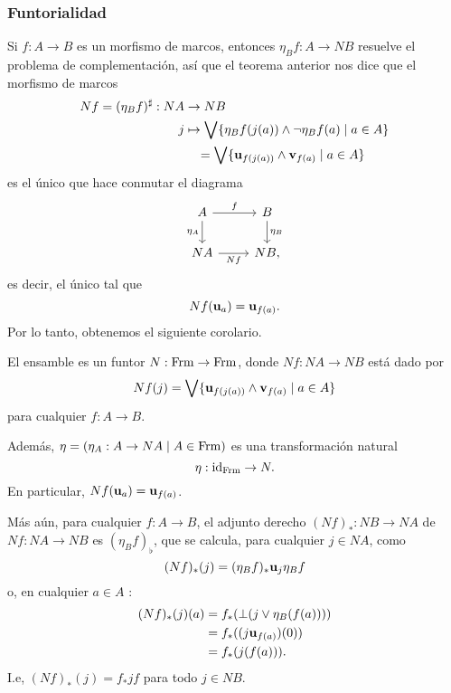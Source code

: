\subsubsection{Funtorialidad}

Si $f:A\to B$ es un morfismo de marcos, entonces
$\eta_Bf:A\to NB$ resuelve
el problema de complementación, así que el teorema anterior nos dice
que el morfismo de marcos
\begin{align}
  Nf=(\eta_Bf)^{\sharp}:NA&\to NB \\
  j&\mapsto \bigvee\{\eta_Bf(j(a)) \wedge \neg \eta_Bf(a)\mid a\in A\} \\
   &\quad =\bigvee\{\mathbf u_{f(j(a))} \wedge \mathbf v_{f(a)}\mid a\in A\}
\end{align}
es el único que hace conmutar el diagrama
\begin{equation}
  \begin{tikzcd}
    A \ar[r,"f"] \ar[d,"\eta_A"'] & B \ar[d,"\eta_B"] \\
    NA \ar[r,"Nf"'] & NB,
  \end{tikzcd}
\end{equation}
es decir, el único tal que
\begin{equation}
  Nf(\mathbf u_{a}) = \mathbf u_{f(a)}
.\end{equation}
Por lo tanto, obtenemos el siguiente corolario.
\begin{corollary}
  El ensamble es un funtor $N:\mathrm{Frm}\to\mathrm{Frm}$, donde $Nf:NA\to NB$ 
  está dado por
  \begin{equation}
    Nf(j) = \bigvee\{\mathbf u_{f(j(a))} \wedge \mathbf v_{f(a)}\mid a\in A\}
  \end{equation}
  para cualquier $f:A\to B$.

  Además, $\eta=(\eta_A:A\to NA\mid A\in\mathrm{Frm})$ es una transformación
  natural
  \begin{equation}
    \eta:\mathrm{id}_{\mathrm{Frm}} \to N
  .\end{equation}
  En particular, $Nf(\mathbf u_{a}) = \mathbf u_{f(a)}$.

  Más aún, para cualquier $f:A\to B$, el adjunto derecho $(Nf)_*:NB\to
  NA$ de $Nf:NA\to NB$ es $(\eta_Bf)_\flat$, que se calcula, para
  cualquier $j\in NA$, como
  \begin{equation}
    (Nf)_*(j) = (\eta_Bf)_*\mathbf u_{j}\eta_Bf
  \end{equation}
  o, en cualquier $a\in A$ :
  \begin{align}
    (Nf)_*(j)(a)
    &= f_*(\bot(j\vee\eta_B(f(a)))) \\
    &= f_*((j\mathbf u_{f(a)})(0)) \\
    &= f_*(j(f(a)))
  .\end{align}
  I.e, $(Nf)_*(j) = f_*jf$ para todo $j\in NB$.
\end{corollary}


